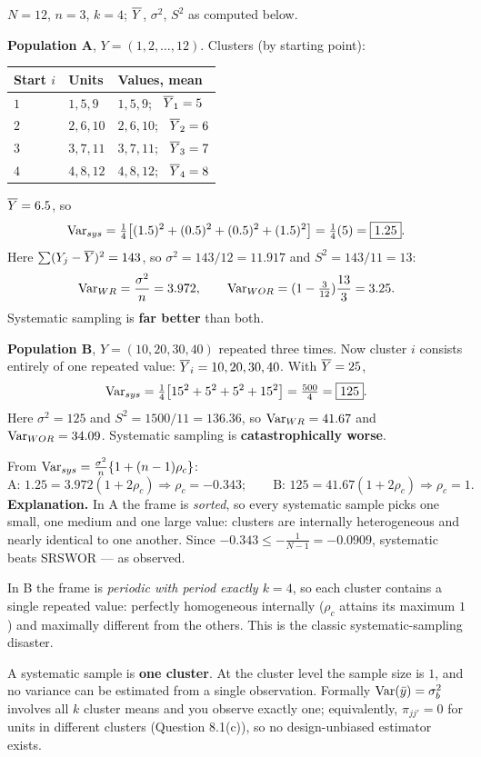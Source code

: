 \sol $N=12$, $n=3$, $k=4$; $\overline{Y}$, $\sigma^2$, $S^2$ as computed below.

 \textbf{Population A}, $Y=(1,2,\dots,12)$. Clusters (by starting point):
\begin{center}\small
\begin{tabular}{@{}lll@{}}
\toprule Start $i$ & Units & Values, mean \\ \midrule
$1$ & $1,5,9$ & $1,5,9$; \ $\overline{Y}_1=5$ \\
$2$ & $2,6,10$ & $2,6,10$; \ $\overline{Y}_2=6$ \\
$3$ & $3,7,11$ & $3,7,11$; \ $\overline{Y}_3=7$ \\
$4$ & $4,8,12$ & $4,8,12$; \ $\overline{Y}_4=8$ \\
\bottomrule\end{tabular}
\end{center}
$\overline{Y}=6.5$, so
\[
  \operatorname{Var}_{sys}=\tfrac14\big[(1.5)^2+(0.5)^2+(0.5)^2+(1.5)^2\big]=\tfrac14(5)=\boxed{1.25}.
\]
Here $\sum(Y_j-\overline{Y})^2=143$, so $\sigma^2=143/12=11.917$ and $S^2=143/11=13$:
\[
  \operatorname{Var}_{WR}=\frac{\sigma^2}{n}=3.972,\qquad
  \operatorname{Var}_{WOR}=(1-\tfrac{3}{12})\frac{13}{3}=3.25 .
\]
Systematic sampling is \textbf{far better} than both.

 \textbf{Population B}, $Y=(10,20,30,40)$ repeated three times. Now cluster $i$ consists
entirely of one repeated value: $\overline{Y}_i=10,20,30,40$. With $\overline{Y}=25$,
\[
  \operatorname{Var}_{sys}=\tfrac14\big[15^2+5^2+5^2+15^2\big]=\tfrac{500}{4}=\boxed{125}.
\]
Here $\sigma^2=125$ and $S^2=1500/11=136.36$, so $\operatorname{Var}_{WR}=41.67$ and $\operatorname{Var}_{WOR}=34.09$.
Systematic sampling is \textbf{catastrophically worse}.

 From $\operatorname{Var}_{sys}=\frac{\sigma^2}{n}\{1+(n-1)\rho_c\}$:
\[
  \text{A: }1.25=3.972(1+2\rho_c)\Rightarrow\rho_c=-0.343;
  \qquad
  \text{B: }125=41.67(1+2\rho_c)\Rightarrow\rho_c=1 .
\]
\textbf{Explanation.} In A the frame is \emph{sorted}, so every systematic sample picks one small,
one medium and one large value: clusters are internally heterogeneous and nearly identical to one
another. Since $-0.343\le-\frac1{N-1}=-0.0909$, systematic beats SRSWOR --- as observed.

In B the frame is \emph{periodic with period exactly $k=4$}, so each cluster contains a single
repeated value: perfectly homogeneous internally ($\rho_c$ attains its maximum $1$) and maximally
different from the others. This is the classic systematic-sampling disaster.

 A systematic sample is \textbf{one cluster}. At the cluster level the sample size is $1$,
and no variance can be estimated from a single observation. Formally $\operatorname{Var}(\bar{y})=\sigma_b^2$
involves all $k$ cluster means and you observe exactly one; equivalently, $\pi_{jj'}=0$ for units
in different clusters (Question 8.1(c)), so no design-unbiased estimator exists.

